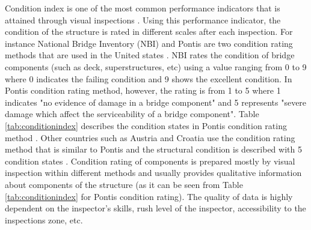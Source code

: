 Condition index is one of the most common performance indicators that is attained through visual inspections \citep{Str2017, Farngbook2019}. Using this performance indicator, 
the condition of the structure is rated in different scales after each inspection. For instance National Bridge Inventory (NBI) and Pontis are two condition rating methods that 
are used in the United states \citep{MASCIOTTA2016, Farngbook2019}. NBI rates the condition of bridge components (such as deck, superstructures, etc) using a value ranging from 
0 to 9 where 0 indicates the failing condition and 9 shows the excellent condition. In Pontis condition rating method, however, the rating is from 1 to 5 where 1 indicates "no 
evidence of damage in a bridge component" and 5 represents "severe damage which affect the serviceability of a bridge component". Table \ref{tab:conditionindex} describes the condition
states in Pontis condition rating method \citep{Farngbook2019}. Other countries such as Austria and Croatia use the condition rating method that is similar to Pontis and the structural condition is 
described with 5 condition states \citep{Str2017}. Condition rating of components is prepared mostly by visual inspection within different methods and usually provides qualitative 
information about components of the structure (as it can be seen from Table \ref{tab:conditionindex} for Pontis condition rating). The quality of data is highly dependent on the 
inspector's skills, rush level of the inspector, accessibility to the inspections zone, etc. 

